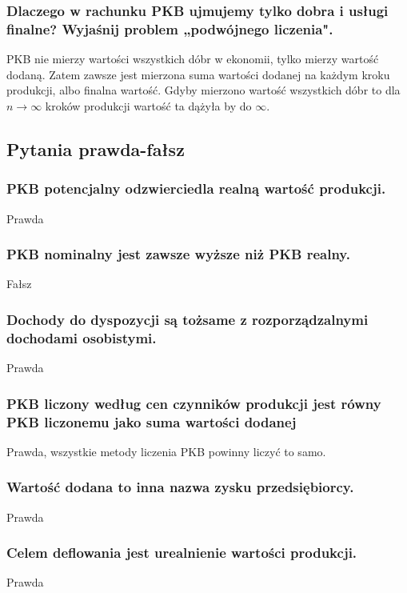 \documentclass[a4paper,12pt]{article}
\begin{document}
\subsubsection{Dlaczego w rachunku PKB ujmujemy tylko dobra i usługi finalne? Wyjaśnij problem „podwójnego liczenia".}

PKB nie mierzy wartości wszystkich dóbr w ekonomii, tylko mierzy wartość dodaną. Zatem zawsze jest mierzona suma wartości dodanej na każdym kroku produkcji, albo finalna wartość. Gdyby mierzono wartość wszystkich dóbr to dla $n \rightarrow \infty$ kroków produkcji wartość ta dążyła by do $\infty$.

\subsection{Pytania prawda-fałsz}

\subsubsection{PKB potencjalny odzwierciedla realną wartość produkcji.}

Prawda

\subsubsection{PKB nominalny jest zawsze wyższe niż PKB realny.}

Fałsz

\subsubsection{Dochody do dyspozycji są tożsame z rozporządzalnymi dochodami osobistymi.}
Prawda

\subsubsection{PKB liczony według cen czynników produkcji jest równy PKB liczonemu jako suma wartości dodanej}
Prawda, wszystkie metody liczenia PKB powinny liczyć to samo.

\subsubsection{Wartość dodana to inna nazwa zysku przedsiębiorcy.}
Prawda

\subsubsection{Celem deflowania jest urealnienie wartości produkcji.}
Prawda
\end{document}
